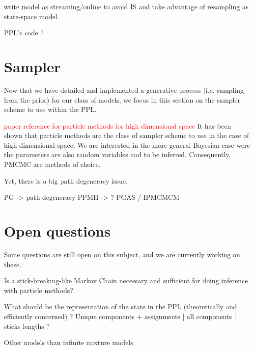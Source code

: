 write model as streaming/online to avoid IS and take advantage of resampling
as state-space model

PPL's code ?

\section{Sampler}
Now that we have detailed and implemented a generative process (i.e. sampling from the prior) for our class of models, we focus in this section on the sampler scheme to use within the \gls{PPL}.

\textcolor{red}{paper reference for particle methods for high dimensional space}
It has been shown that particle methods are the class of sampler scheme to use in the case of high dimensional space.
We are interested in the more general Bayesian case were the parameters are also random variables and to be inferred. Consequently, \acrlong{PMCMC} are methods of choice.

Yet, there is a big path degeneracy issue.

PG -> path degeneracy
PPMH -> ?
PGAS / IPMCMCM


\section{Open questions}
Some questions are still open on this subject, and we are currently working on these.

Is a stick-breaking-like Markov Chain necessary and sufficient for doing inference with particle methods?


What should be the representation of the state in the PPL (theoretically and efficiently concerned) ? Unique components + assignments | all components | sticks lengths ? 

Other models than infinite mixture models  
